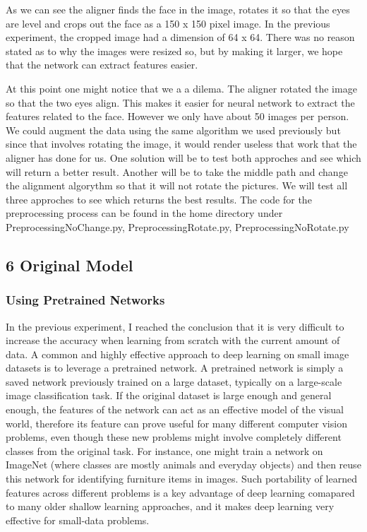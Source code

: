\documentclass[11pt]{article}
\begin{document}
As we can see the aligner finds the face in the image, rotates it so
that the eyes are level and crops out the face as a 150 x 150 pixel
image. In the previous experiment, the cropped image had a dimension of
64 x 64. There was no reason stated as to why the images were resized
so, but by making it larger, we hope that the network can extract
features easier.

At this point one might notice that we a a dilema. The aligner rotated
the image so that the two eyes align. This makes it easier for neural
network to extract the features related to the face. However we only
have about 50 images per person. We could augment the data using the
same algorithm we used previously but since that involves rotating the
image, it would render useless that work that the aligner has done for
us. One solution will be to test both approches and see which will
return a better result. Another will be to take the middle path and
change the alignment algorythm so that it will not rotate the pictures.
We will test all three approches to see which returns the best results.
The code for the preprocessing process can be found in the home
directory under PreprocessingNoChange.py, PreprocessingRotate.py,
PreprocessingNoRotate.py

    \subsection{6 Original Model}\label{original-model}

    \subsubsection{Using Pretrained
Networks}\label{using-pretrained-networks}

    In the previous experiment, I reached the conclusion that it is very
difficult to increase the accuracy when learning from scratch with the
current amount of data. A common and highly effective approach to deep
learning on small image datasets is to leverage a pretrained network. A
pretrained network is simply a saved network previously trained on a
large dataset, typically on a large-scale image classification task. If
the original dataset is large enough and general enough, the features of
the network can act as an effective model of the visual world, therefore
its feature can prove useful for many different computer vision
problems, even though these new problems might involve completely
different classes from the original task. For instance, one might train
a network on ImageNet (where classes are mostly animals and everyday
objects) and then reuse this network for identifying furniture items in
images. Such portability of learned features across different problems
is a key advantage of deep learning comapared to many older shallow
learning approaches, and it makes deep learning very effective for
small-data problems.
\end{document}
